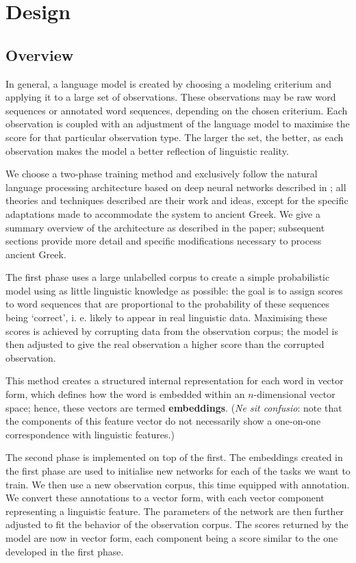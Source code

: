 \chapter{Design}
\label{chp:design} %

\section{Overview}
In general, a language model is created by choosing a modeling
criterium and applying it to a large set of observations. These
observations may be raw word sequences or annotated word sequences,
depending on the chosen criterium. Each observation is coupled with an
adjustment of the language model to maximise the score for that
particular observation type. The larger the set, the better, as each
observation makes the model a better reflection of linguistic reality.

We choose a two-phase training method and exclusively follow the
natural language processing architecture based on deep neural networks
described in \cite{collobert-2011}; all theories and techniques
described are their work and ideas, except for the specific
adaptations made to accommodate the system to ancient Greek. We give a
summary overview of the architecture as described in the paper;
subsequent sections provide more detail and specific modifications
necessary to process ancient Greek.

The first phase uses a large unlabelled corpus to create a simple
probabilistic model using as little linguistic knowledge as possible:
the goal is to assign scores to word sequences that are proportional
to the probability of these sequences being `correct', i. e. likely to
appear in real linguistic data. Maximising these scores is achieved by
corrupting data from the observation corpus; the model is then
adjusted to give the real observation a higher score than the
corrupted observation.

This method creates a structured internal representation for each word
in vector form, which defines how the word is embedded within an
$n$-dimensional vector space; hence, these vectors are termed
\textbf{embeddings}. (\textit{Ne sit confusio}: note that the
components of this feature vector do not necessarily show a one-on-one
correspondence with linguistic features.)

The second phase is implemented on top of the first. The embeddings
created in the first phase are used to initialise new networks for
each of the tasks we want to train. We then use a new observation
corpus, this time equipped with annotation. We convert these
annotations to a vector form, with each vector component representing
a linguistic feature. The parameters of the network are then further
adjusted to fit the behavior of the observation corpus. The scores
returned by the model are now in vector form, each component being a
score similar to the one developed in the first phase.

